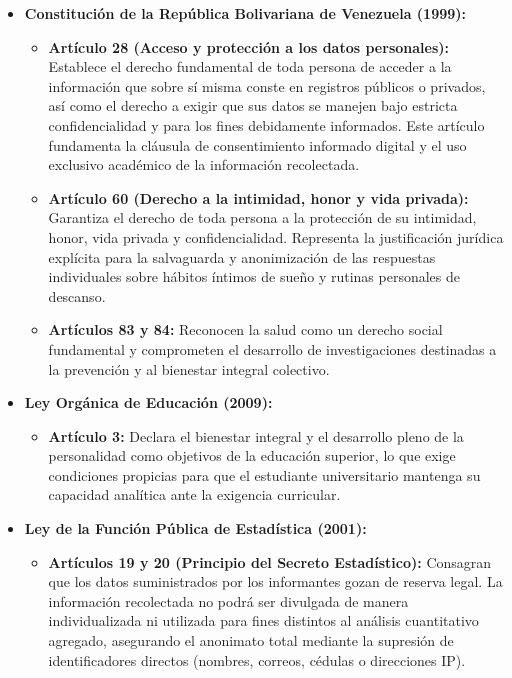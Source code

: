 \documentclass[12pt, letterpaper]{article}
\begin{document}
\begin{itemize}
    \item \textbf{Constitución de la República Bolivariana de Venezuela (1999):}
    \begin{itemize}
        \item \textbf{Artículo 28 (Acceso y protección a los datos personales):} Establece el derecho fundamental de toda persona de acceder a la información que sobre sí misma conste en registros públicos o privados, así como el derecho a exigir que sus datos se manejen bajo estricta confidencialidad y para los fines debidamente informados. Este artículo fundamenta la cláusula de consentimiento informado digital y el uso exclusivo académico de la información recolectada.
        \item \textbf{Artículo 60 (Derecho a la intimidad, honor y vida privada):} Garantiza el derecho de toda persona a la protección de su intimidad, honor, vida privada y confidencialidad. Representa la justificación jurídica explícita para la salvaguarda y anonimización de las respuestas individuales sobre hábitos íntimos de sueño y rutinas personales de descanso.
        \item \textbf{Artículos 83 y 84:} Reconocen la salud como un derecho social fundamental y comprometen el desarrollo de investigaciones destinadas a la prevención y al bienestar integral colectivo.
    \end{itemize}
    
    \item \textbf{Ley Orgánica de Educación (2009):}
    \begin{itemize}
        \item \textbf{Artículo 3:} Declara el bienestar integral y el desarrollo pleno de la personalidad como objetivos de la educación superior, lo que exige condiciones propicias para que el estudiante universitario mantenga su capacidad analítica ante la exigencia curricular.
    \end{itemize}
    
    \item \textbf{Ley de la Función Pública de Estadística (2001):}
    \begin{itemize}
        \item \textbf{Artículos 19 y 20 (Principio del Secreto Estadístico):} Consagran que los datos suministrados por los informantes gozan de reserva legal. La información recolectada no podrá ser divulgada de manera individualizada ni utilizada para fines distintos al análisis cuantitativo agregado, asegurando el anonimato total mediante la supresión de identificadores directos (nombres, correos, cédulas o direcciones IP).
    \end{itemize}
\end{itemize}
\end{document}
